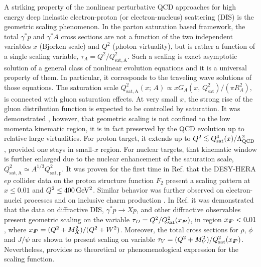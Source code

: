 \documentclass[twocolumn,showpacs,preprintnumbers,amsmath,amssymb,showkeys,aps,prd,a4paper,byrevtex]{revtex4}
\begin{document}
A striking property of the nonlinear  perturbative QCD  approaches for high energy deep inelastic electron-proton (or electron-nucleus) scattering (DIS)  is
the geometric scaling phenomenon. In the parton saturation based framework,  the total
$\gamma^* p$ and  $\gamma^* A$ cross sections are not a function of
the two independent variables $x$ (Bjorken scale) and $Q^2$ (photon virtuality), but is rather a
function \cite{travwaves} of a single scaling variable, $\tau_A = Q^2/Q_{\mathrm{sat,A}}^2$. Such a scaling is exact asymptotic solution of a general class of nonlinear evolution equations \cite{KPP,BK}  and it is a universal property of them. In particular, it corresponds to the traveling wave solutions of those equations. The saturation scale $Q_{\mathrm{sat,A}}^2(x;\,A)\propto xG_A(x,\, Q_{\mathrm{sat}}^2) /(\pi R_A^2)$, is connected with gluon saturation effects. At very small $x$, the strong rise of the gluon distribution function is expected to be controlled by saturation. It was demonstrated \cite{Iancu:2002tr}, however, that geometric scaling is not confined to the low momenta kinematic region, it is in fact preserved by the QCD evolution up to relative large virtualities. For proton target, it extends up to $Q^2 \simle Q_{\mathrm{sat}}^4 (x)/\Lambda^2_{\mathrm{QCD}}$,  provided one stays in small-$x$ region. For nuclear targets, that kinematic window is further enlarged due to the nuclear enhancement of the saturation scale, $Q_{\mathrm{sat,A}}^2\simeq A^{1/3}Q_{\mathrm{sat,p}}^2$. It was proven for the first time in Ref. \cite{Stasto:2000er} that the DESY-HERA $ep$ collider data
on the proton structure function $F_2$ present a scaling pattern 
at $x \leq 0.01$ and $Q^2 \leq \unit[400]{GeV^2}$. Similar behavior was further observed on  electron-nuclei processes \cite{Freund:2002ux} and on inclusive charm production \cite{magvicprl}. In Ref. \cite{MS} it was demonstrated that the data on diffractive DIS, $\gamma^*p\rightarrow Xp$, and other diffractive observables present geometric scaling on the variable $\tau_D = Q^2/Q_{\mathrm{sat}}^2(x_{I\!\!P})$, in region $x_{I\!\!P}<0.01$, where $x_{I\!\!P} = (Q^2+M_X^2)/(Q^2+W^2)$. Moreover, the total cross sections for $\rho$, $\phi$ and $J/\psi$ are shown to present scaling on variable $\tau_V = (Q^2+M_V^2)/Q_{\mathrm{sat}}^2(x_{I\!\!P})$. Nevertheless, \cite{MS} provides no theoretical or phenomenological expression for the scaling function. 
\end{document}
